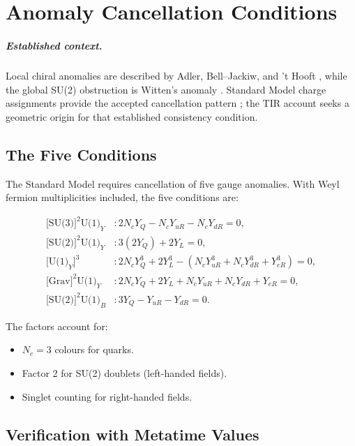 \chapter{Anomaly Cancellation Conditions}
\label{ch:anomaly_cancellation}


\paragraph{Established context.}
Local chiral anomalies are described by Adler, Bell--Jackiw, and 't Hooft
\cite{Adler1969,BellJackiw1969,tHooft1976}, while the global SU(2) obstruction is
Witten's anomaly \cite{witten1982}.  Standard Model charge assignments provide
the accepted cancellation pattern \cite{Weinberg1967,PDG2024}; the TIR account
seeks a geometric origin for that established consistency condition.

\section{The Five Conditions}

The Standard Model requires cancellation of five gauge anomalies.
With Weyl fermion multiplicities included, the five conditions are:

\[
\begin{aligned}
\text{[SU(3)]}^2\text{U(1)}_Y &: 
2N_c Y_Q - N_c Y_{uR} - N_c Y_{dR} = 0, \\[4pt]
\text{[SU(2)]}^2\text{U(1)}_Y &: 
3(2Y_Q) + 2Y_L = 0, \\[4pt]
\text{[U(1)}_Y]^3 &: 
2N_c Y_Q^3 + 2Y_L^3 - \left(N_c Y_{uR}^3 + N_c Y_{dR}^3 + Y_{eR}^3\right) = 0, \\[4pt]
\text{[Grav]}^2\text{U(1)}_Y &: 
2N_c Y_Q + 2Y_L + N_c Y_{uR} + N_c Y_{dR} + Y_{eR} = 0, \\[4pt]
\text{[SU(2)]}^2\text{U(1)}_B &: 
3Y_Q - Y_{uR} - Y_{dR} = 0.
\end{aligned}
\]

The factors account for:
\begin{itemize}
\item \(N_c = 3\) colours for quarks.
\item Factor 2 for SU(2) doublets (left-handed fields).
\item Singlet counting for right-handed fields.
\end{itemize}

\section{Verification with Metatime Values}

